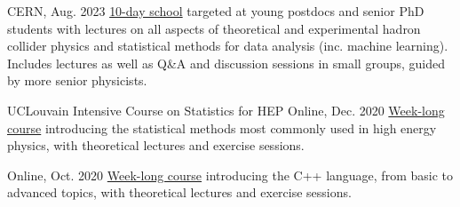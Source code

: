 \begin{cventries}
    {}{CERN, Aug. 2023}
    {\href{https://indico.cern.ch/event/1234112/}{10-day school} targeted at young postdocs and senior PhD students with lectures on all aspects of theoretical and experimental hadron collider physics and statistical methods for data analysis (inc. machine learning). Includes lectures as well as Q\&A and discussion sessions in small groups, guided by more senior physicists.}
\end{cventries}

\begin{cventries}
    \cventry
    {{UCLouvain Intensive Course on Statistics for HEP}}{}
    {}{Online, Dec. 2020}
    {\href{https://agenda.irmp.ucl.ac.be/event/4097/}{Week-long course} introducing the statistical methods most commonly used in high energy physics, with theoretical lectures and exercise sessions.}
    
    {}{Online, Oct. 2020}
    {\href{https://indico.cern.ch/event/946584}{Week-long course} introducing the C++ language, from basic to advanced topics, with theoretical lectures and exercise sessions.}
\end{cventries}
